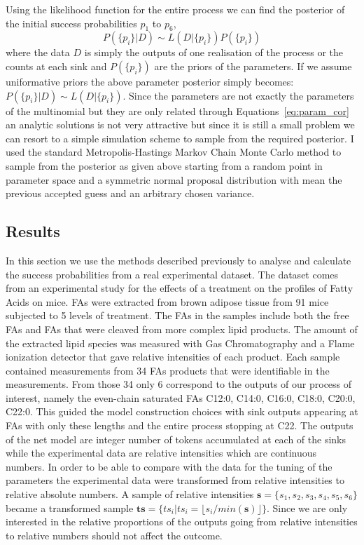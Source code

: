 Using the likelihood function for the entire process we can find the
posterior of the initial success probabilities $p_1$ to $p_6$,
\begin{equation*}
P(\{p_i\} | D) \sim L(D | \{p_i\}) P(\{p_i\})
\end{equation*}
where the data $D$ is simply the outputs of one realisation of the
process or the counts at each sink and $P(\{p_i\})$ are the priors of
the parameters. If we assume uniformative priors the above parameter
posterior simply becomes: $P(\{p_i\} | D) \sim L(D | \{p_i\})$. Since
the parameters are not exactly the parameters of the multinomial but
they are only related through Equations~\ref{eq:param_cor} an analytic
solutions is not very attractive but since it is still a small problem
we can resort to a simple simulation scheme to sample from the required
posterior. I used the standard Metropolis-Hastings Markov Chain Monte Carlo method to
sample from the posterior as given above starting from a random point
in parameter space and a symmetric normal proposal distribution with
mean the previous accepted guess and an arbitrary chosen variance.


\subsection{Results}
\label{sec:results}
In this section we use the methods described previously to analyse and
calculate the success probabilities from a real experimental
dataset. The dataset comes from an experimental study for the effects
of a treatment on the profiles of Fatty Acids on mice. FAs
were extracted from brown adipose tissue from 91 mice subjected to 5
levels of treatment. The FAs in the samples include both the free FAs
and FAs that were cleaved from more complex lipid products. The amount
of the extracted lipid species was measured with Gas Chromatography
and a Flame ionization detector that gave relative intensities of each
product. Each sample contained measurements from 34 FAs products that
were identifiable in the measurements. From those 34 only 6 correspond
to the outputs of our process of interest, namely the even-chain saturated FAs
C12:0, C14:0, C16:0, C18:0, C20:0, C22:0. This guided the model
construction choices with sink outputs appearing at FAs with only these
lengths and the entire process stopping at C22. The outputs of the net model are integer number of tokens accumulated
at each of the sinks while the experimental
data are relative intensities which are continuous numbers. In order
to be able to compare with the data for the tuning of the parameters the
experimental data were transformed from relative intensities to
relative absolute numbers. A sample of relative
intensities $\mathbf{s} = \{s_1, s_2, s_3, s_4, s_5, s_6\}$ became a
transformed sample $\mathbf{ts} = \{ ts_i | ts_i = \lfloor s_i /
min(\mathbf{s}) \rfloor \}$.
 Since we are only interested in the
relative proportions of the outputs going from relative intensities to
relative numbers should not affect the outcome.

